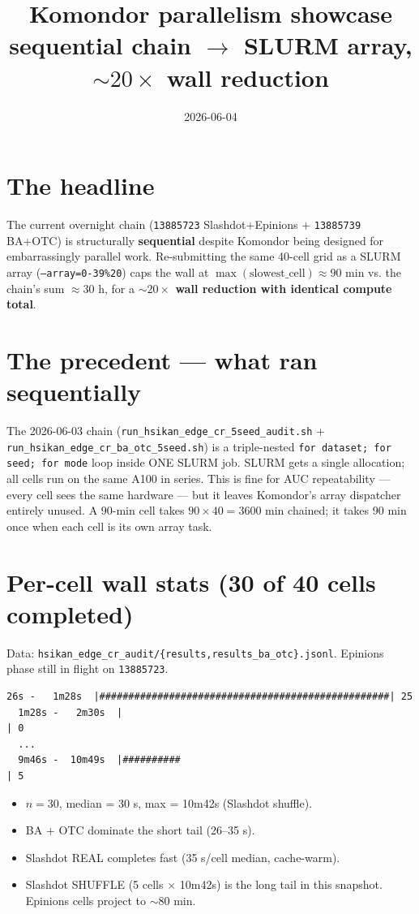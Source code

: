\documentclass[11pt,a4paper]{article}
\title{Komondor parallelism showcase\\
       \large sequential chain $\to$ SLURM array, $\sim 20\times$ wall reduction}
\author{2026-06-04}
\date{}
\begin{document}
\maketitle

\section*{The headline}

The current overnight chain (\texttt{13885723} Slashdot+Epinions +
\texttt{13885739} BA+OTC) is structurally \textbf{sequential} despite
Komondor being designed for embarrassingly parallel work. Re-submitting
the same 40-cell grid as a SLURM array
(\texttt{--array=0-39\%20}) caps the wall at
$\max(\text{slowest\_cell}) \approx 90$ min vs. the chain's sum
$\approx 30$ h, for a \textbf{$\sim 20\times$ wall reduction with
identical compute total}.

\section{The precedent --- what ran sequentially}

The 2026-06-03 chain (\texttt{run\_hsikan\_edge\_cr\_5seed\_audit.sh}
+ \texttt{run\_hsikan\_edge\_cr\_ba\_otc\_5seed.sh}) is a triple-nested
\texttt{for dataset; for seed; for mode} loop inside ONE SLURM job.
SLURM gets a single allocation; all cells run on the same A100 in
series. This is fine for AUC repeatability --- every cell sees the
same hardware --- but it leaves Komondor's array dispatcher entirely
unused. A 90-min cell takes $90 \times 40 = 3600$ min chained; it
takes 90 min once when each cell is its own array task.

\section{Per-cell wall stats (30 of 40 cells completed)}

Data: \texttt{hsikan\_edge\_cr\_audit/\{results,results\_ba\_otc\}.jsonl}.
Epinions phase still in flight on \texttt{13885723}.

\begin{lstlisting}[style=txt]
    26s -   1m28s  |##################################################| 25
  1m28s -   2m30s  |                                                  | 0
  ...
  9m46s -  10m49s  |##########                                        | 5
\end{lstlisting}

\begin{itemize}[nosep]
  \item $n = 30$, median = 30 s, max = 10m42s (Slashdot shuffle).
  \item BA + OTC dominate the short tail (26--35 s).
  \item Slashdot REAL completes fast (35 s/cell median, cache-warm).
  \item Slashdot SHUFFLE (5 cells $\times$ 10m42s) is the long tail
        in this snapshot. Epinions cells project to $\sim 80$ min.
\end{itemize}
\end{document}
